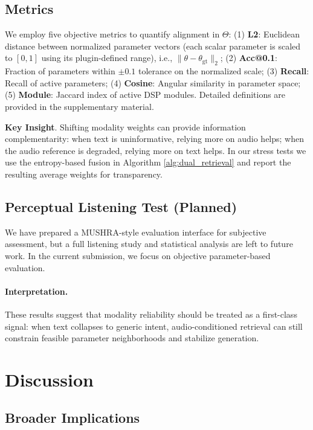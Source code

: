 \documentclass{article}
\begin{document}
\subsection{Metrics}
\label{ssec:metrics}
We employ five objective metrics to quantify alignment in $\Theta$:
(1) \textbf{L2}: Euclidean distance between normalized parameter vectors (each scalar parameter is scaled to $[0,1]$ using its plugin-defined range), i.e., $\|\theta - \theta_{\text{gt}}\|_2$;
(2) \textbf{Acc@0.1}: Fraction of parameters within $\pm 0.1$ tolerance on the normalized scale;
(3) \textbf{Recall}: Recall of active parameters;
(4) \textbf{Cosine}: Angular similarity in parameter space;
(5) \textbf{Module}: Jaccard index of active DSP modules.
Detailed definitions are provided in the supplementary material.

\textbf{Key Insight}. Shifting modality weights can provide information complementarity: when text is uninformative, relying more on audio helps; when the audio reference is degraded, relying more on text helps. In our stress tests we use the entropy-based fusion in Algorithm \ref{alg:dual_retrieval} and report the resulting average weights for transparency.

\subsection{Perceptual Listening Test (Planned)}

We have prepared a MUSHRA-style evaluation interface for subjective assessment, but a full listening study and statistical analysis are left to future work. In the current submission, we focus on objective parameter-based evaluation.

\paragraph{Interpretation.} These results suggest that modality reliability should be treated as a first-class signal: when text collapses to generic intent, audio-conditioned retrieval can still constrain feasible parameter neighborhoods and stabilize generation.

\section{Discussion}
\label{sec:discussion}

\subsection{Broader Implications}
\end{document}
